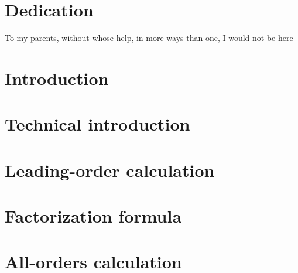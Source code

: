 \documentclass[12pt,twoside]{reedthesis}
\begin{document}
	\chapter*{Dedication}
	To my parents, without whose help, in more ways than one, I would not be here

  \mainmatter %
  \pagestyle{fancyplain} %


\chapter*{Introduction}

	\graphicspath{{introduction/}}
	

	

\chapter{Technical introduction}\label{chap:technical}
	
	\graphicspath{{technical_introduction/}}
	


\chapter{Leading-order calculation}\label{chap:leading order}

	\graphicspath{{leading_order/}}
	


\chapter{Factorization formula}\label{chap:factorization}

	\graphicspath{{factorization/}}
	


\chapter{All-orders calculation}\label{chap:all orders}
	
\end{document}
